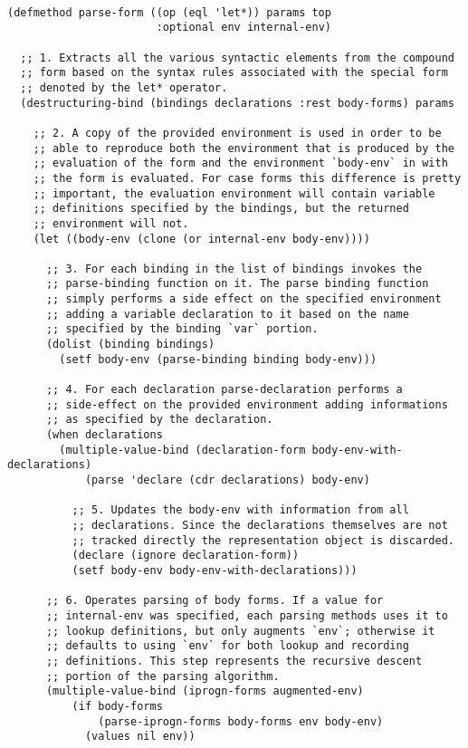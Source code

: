 \begin{lstlisting}[caption=Semplificazione del metodo \texttt{PARSE-FORM} per
il parsing del costrutto \texttt{LET*}]

(defmethod parse-form ((op (eql 'let*)) params top
                       :optional env internal-env)

  ;; 1. Extracts all the various syntactic elements from the compound
  ;; form based on the syntax rules associated with the special form
  ;; denoted by the let* operator.
  (destructuring-bind (bindings declarations :rest body-forms) params

    ;; 2. A copy of the provided environment is used in order to be
    ;; able to reproduce both the environment that is produced by the
    ;; evaluation of the form and the environment `body-env` in with
    ;; the form is evaluated. For case forms this difference is pretty
    ;; important, the evaluation environment will contain variable
    ;; definitions specified by the bindings, but the returned
    ;; environment will not.
    (let ((body-env (clone (or internal-env body-env))))

      ;; 3. For each binding in the list of bindings invokes the
      ;; parse-binding function on it. The parse binding function
      ;; simply performs a side effect on the specified environment
      ;; adding a variable declaration to it based on the name
      ;; specified by the binding `var` portion.
      (dolist (binding bindings)
        (setf body-env (parse-binding binding body-env)))

      ;; 4. For each declaration parse-declaration performs a
      ;; side-effect on the provided environment adding informations
      ;; as specified by the declaration.
      (when declarations
        (multiple-value-bind (declaration-form body-env-with-declarations)
            (parse 'declare (cdr declarations) body-env)

          ;; 5. Updates the body-env with information from all
          ;; declarations. Since the declarations themselves are not
          ;; tracked directly the representation object is discarded.
          (declare (ignore declaration-form))
          (setf body-env body-env-with-declarations)))

      ;; 6. Operates parsing of body forms. If a value for
      ;; internal-env was specified, each parsing methods uses it to
      ;; lookup definitions, but only augments `env`; otherwise it
      ;; defaults to using `env` for both lookup and recording
      ;; definitions. This step represents the recursive descent
      ;; portion of the parsing algorithm.
      (multiple-value-bind (iprogn-forms augmented-env)
          (if body-forms
              (parse-iprogn-forms body-forms env body-env)
            (values nil env))


\end{lstlisting}
